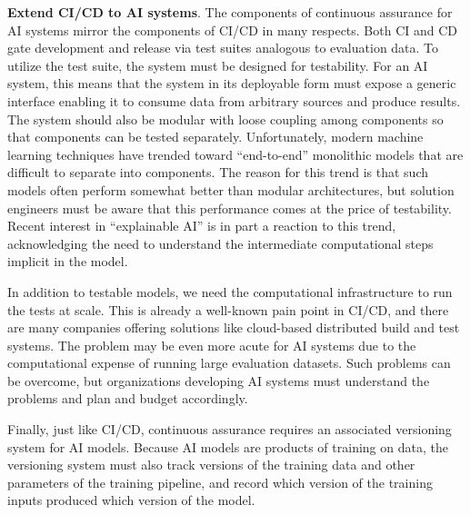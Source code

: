 \textbf{Extend CI/CD to AI systems}. The components of continuous assurance for AI systems mirror the components of CI/CD in many respects. Both CI and CD gate development and release via test suites analogous to evaluation data. To utilize the test suite, the system must be designed for testability. For an AI system, this means that the system in its deployable form must expose a generic interface enabling it to consume data from arbitrary sources and produce results. The system should also be modular with loose coupling among components so that components can be tested separately. Unfortunately, modern machine learning techniques have trended toward ``end-to-end'' monolithic models that are difficult to separate into components. The reason for this trend is that such models often perform somewhat better than modular architectures, but solution engineers must be aware that this performance comes at the price of testability. Recent interest in ``explainable AI'' is in part a reaction to this trend, acknowledging the need to understand the intermediate computational steps implicit in the model.

In addition to testable models, we need the computational infrastructure to run the tests at scale. This is already a well-known pain point in CI/CD, and there are many companies offering solutions like cloud-based distributed build and test systems. The problem may be even more acute for AI systems due to the computational expense of running large evaluation datasets. Such problems can be overcome, but organizations developing AI systems must understand the problems and plan and budget accordingly.

Finally, just like CI/CD, continuous assurance requires an associated versioning system for AI models. Because AI models are products of training on data, the versioning system must also track versions of the training data and other parameters of the training pipeline, and record which version of the training inputs produced which version of the model.

